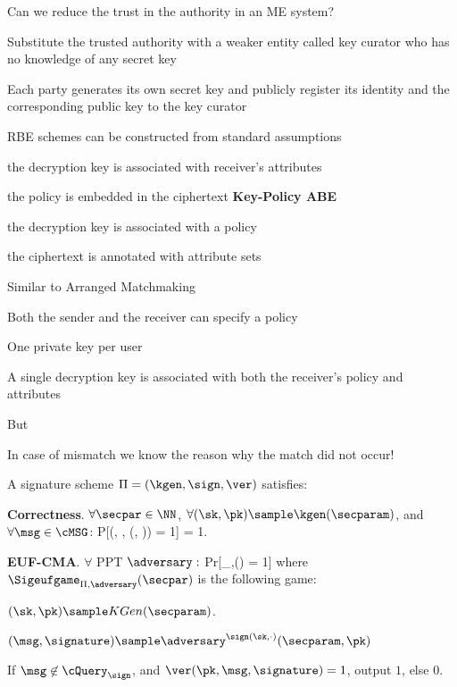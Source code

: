 {\important Can we reduce the trust in the authority in an ME system?}
\stopslide

\startslide[title={Registration-Based ME}]
\startitemize[broad]
\item Substitute the trusted authority with a weaker entity called key curator who has no knowledge of any secret key
\item Each party generates its own secret key and publicly register its identity and the corresponding public key to the key curator
\item RBE schemes can be constructed from standard assumptions
\stopitemize
\stopslide

\item the decryption key is associated with receiver's attributes
\item the policy is embedded in the ciphertext
\stopitemize
{\bf Key-Policy ABE}
\item the decryption key is associated with a policy
\item the ciphertext is annotated with attribute sets
\stopitemize
\stopslide

\startslide[title={Dual-policy ABE}]
Similar to Arranged Matchmaking
\startitemize[packed]
\item Both the sender and the receiver can specify a policy
\item One private key per user
\item A single decryption key is associated with both the receiver’s policy and attributes
\stopitemize

But
\startitemize[packed]
\item In case of mismatch we know the reason why the match did not occur!
\stopitemize
\stopslide

\startslide[title={Signatures: a formal definition}]
A signature scheme $\Pi = (\kgen, \sign, \ver)$ satisfies:
\item {\bf Correctness}. $\forall\secpar\in\NN$, $\forall (\sk, \pk) \sample \kgen(\secparam)$, and $\forall \msg \in \cMSG$:
\startformula
P[\ver(\pk, \msg, \sign(\sk, \msg)) = 1] = 1.
\stopformula
\item {\bf EUF-CMA}. $\forall$ PPT $\adversary:$
\startformula
Pr[\Sigeufgame_{\Pi,\adversary}(\secpar) = 1] \leq \negl
\stopformula
where $\Sigeufgame_{\Pi,\adversary}(\secpar)$ is the following game:
\startitemize[packed]
\item $(\sk, \pk) \sample KGen(\secparam)$.
\item $(\msg, \signature) \sample \adversary^{\sign(\sk, \cdot)}(\secparam, \pk)$
\item If $\msg \not\in \cQuery_{\sign}$, and $\ver(\pk,\msg, \signature) = 1$, output $1$, else $0$.
\stopitemize
\stopslide

